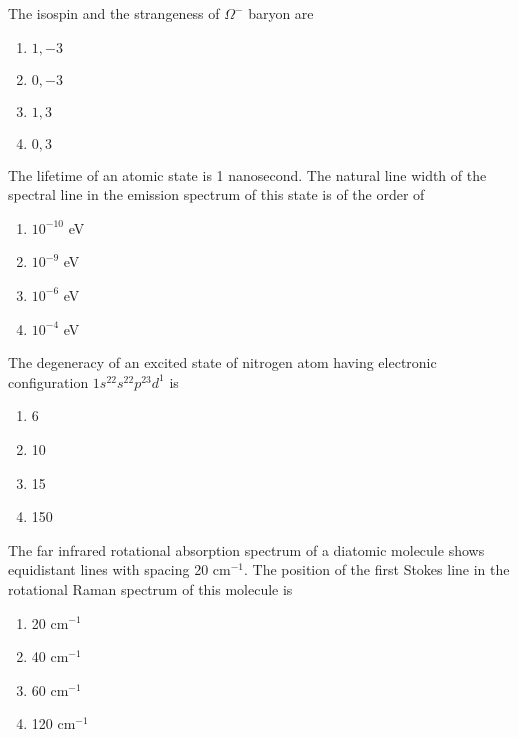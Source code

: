 \iffalse
\chapter{2011}
\author{AI24BTECH11031}
\section{ph}
\fi

\item The isospin and the strangeness of $\Omega^-$ baryon are
\begin{multicols}{4}
    \begin{enumerate}
        \item $1,-3$
        \item $0,-3$
        \item $1,3$
        \item $0,3$
    \end{enumerate}
\end{multicols}

\item The lifetime of an atomic state is 1 nanosecond. The natural line width of the spectral line in the emission spectrum
of this state is of the order of
\begin{multicols}{2}
    \begin{enumerate}
        \item $10^{-10}$ eV
        \item $10^{-9}$ eV
        \item $10^{-6}$ eV
        \item $10^{-4}$ eV
    \end{enumerate}
\end{multicols}

\item The degeneracy of an excited state of nitrogen atom having electronic configuration
$1s^22s^22p^23d^1$ is
\begin{multicols}{4}
    \begin{enumerate}
        \item 6
        \item 10
        \item 15
        \item 150
    \end{enumerate}
\end{multicols}

\item The far infrared rotational absorption spectrum of a diatomic molecule shows
equidistant lines with spacing 20 cm$^{-1}$. The position of the first Stokes line
in the rotational Raman spectrum of this molecule is
\begin{multicols}{4}
    \begin{enumerate}
        \item 20 cm$^{-1}$
        \item 40 cm$^{-1}$
        \item 60 cm$^{-1}$
        \item 120 cm$^{-1}$
    \end{enumerate}
\end{multicols}

